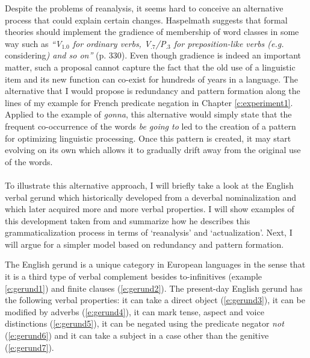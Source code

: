 Despite the problems of reanalysis, it seems hard to conceive an alternative process that could explain certain changes. Haspelmath suggests that formal theories should implement the gradience of membership of word classes in some way such as {\em ``V$_{1.0}$ for ordinary verbs, V$_{.7}$/P$_{.3}$ for preposition-like verbs (e.g.} considering{\em) and so on''} (p. 330). Even though gradience is indeed an important matter, such a proposal cannot capture the fact that the old use of a linguistic item and its new function can co-exist for hundreds of years in a language. The alternative that I would propose is  redundancy and pattern formation along the lines of my example for French predicate negation in Chapter \ref{c:experiment1}. Applied to the example of {\em gonna}, this alternative would simply state that the frequent co-occurrence of the words {\em be going to} led to the creation of a pattern for optimizing linguistic processing. Once this pattern is created, it may start evolving on its own which allows it to gradually drift away from the original use of the words.
\\
\\
 To illustrate this alternative approach, I will briefly take a look at the English verbal gerund which historically developed from a deverbal nominalization and which later acquired more and more verbal properties. I will show examples of this development taken from \citet{fanego04reanalysis} and summarize how he describes this grammaticalization process in terms of `reanalysis' and `actualization'. Next, I will argue for a simpler model based on  redundancy and pattern formation.

The English gerund is a unique category in European languages in the sense that it is a third type of verbal complement besides  to-infinitives (example \ref{e:gerund1}) and finite clauses (\ref{e:gerund2}). The present-day English gerund has the following verbal properties: it can take a direct object (\ref{e:gerund3}), it can be modified by adverbs (\ref{e:gerund4}), it can mark tense, aspect and voice distinctions (\ref{e:gerund5}), it can be negated using the predicate negator {\em not} (\ref{e:gerund6}) and it can take a subject in a case other than the genitive (\ref{e:gerund7}).

